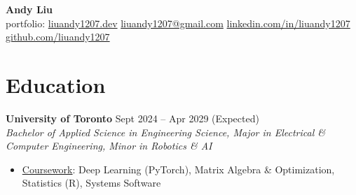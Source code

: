\documentclass[10pt,letterpaper]{article}
\begin{document}
\begin{center}
\huge{\textbf{Andy Liu}} \\
\vspace{0.25em}
\small{{portfolio: 
    \href{https://liuandy1207.dev}{liuandy1207.dev}}
    \hspace{0.5em} \textbar\hspace{0.5em}
    \href{mailto: liuandy1207@gmail.com}{liuandy1207@gmail.com}
    \hspace{0.5em} \textbar\hspace{0.5em}
    \href{https://www.linkedin.com/in/liuandy1207/}{linkedin.com/in/liuandy1207}}
    \hspace{0.5em} \textbar\hspace{0.5em}
    \href{https://github.com/liuandy1207}{github.com/liuandy1207}
\end{center} \vspace{-0.7em}







\section{Education}

\textbf{University of Toronto} \hfill
Sept 2024 -- Apr 2029 (Expected) \\
\textit{Bachelor of Applied Science in Engineering Science, Major in Electrical \& Computer Engineering, Minor in Robotics \& AI} \hfill 
\begin{itemize}
    \item \underline{Coursework}: 
    Deep Learning (PyTorch), Matrix Algebra \& Optimization, Statistics (R), Systems Software
\end{itemize} \vspace{0.25em}
\end{document}

